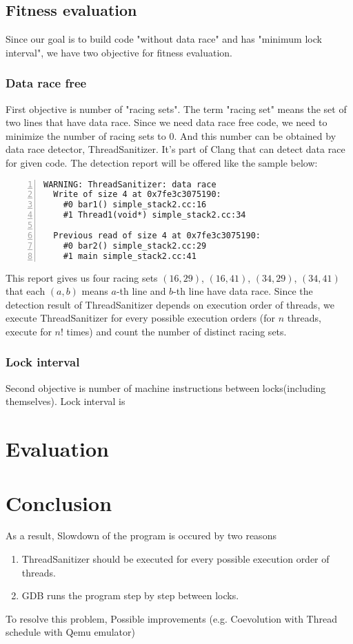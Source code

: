 \documentclass[sigconf]{acmart}
\begin{document}
\subsection{Fitness evaluation}
Since our goal is to build code "without data race" and has "minimum lock interval", we have two objective for fitness evaluation. 

\subsubsection{Data race free}
First objective is number of "racing sets". The term "racing set" means the set of two lines that have data race. Since we need data race free code, we need to minimize the number of racing sets to 0. And this number can be obtained by data race detector, ThreadSanitizer. It's part of Clang that can detect data race for given code. The detection report will be offered like the sample below:

\begin{lstlisting}[frame=tb, xleftmargin=2em, framexleftmargin=1.5em, numbers=left]
WARNING: ThreadSanitizer: data race
  Write of size 4 at 0x7fe3c3075190:
    #0 bar1() simple_stack2.cc:16
    #1 Thread1(void*) simple_stack2.cc:34

  Previous read of size 4 at 0x7fe3c3075190:
    #0 bar2() simple_stack2.cc:29
    #1 main simple_stack2.cc:41
\end{lstlisting}

This report gives us four racing sets $(16, 29)$, $(16, 41)$, $(34, 29)$, $(34, 41)$ that each $(a, b)$ means $a$-th line and $b$-th line have data race. Since the detection result of ThreadSanitizer depends on execution order of threads, we execute ThreadSanitizer for every possible execution orders (for $n$ threads, execute for $n!$ times) and count the number of distinct racing sets.
 
\subsubsection{Lock interval}
Second objective is number of machine instructions between locks(including themselves). Lock interval is 

\section{Evaluation}


\section{Conclusion}
As a result,
Slowdown of the program is occured by two reasons
\begin{enumerate}
    \item ThreadSanitizer should be executed for every possible execution order of threads.
    \item GDB runs the program step by step between locks.
\end{enumerate}
To resolve this problem, 
Possible improvements (e.g. Coevolution with Thread schedule with Qemu emulator)
\end{document}
